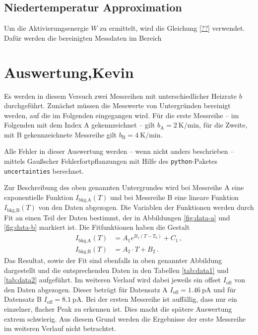 \subsection{Niedertemperatur Approximation}
Um die Aktivierungsenergie $W$ zu ermittelt, wird die Gleichung \eqref{??} verwendet.
Dafür werden die bereinigten Messdaten im Bereich  



























\section{Auswertung,Kevin}
Es werden in diesem Versuch zwei Messreihen mit unterschiedlicher Heizrate
$b$ durchgeführt. Zunächst müssen die Messwerte von Untergründen bereinigt
werden, auf die im Folgenden eingegangen wird.
Für die erste Messreihe -- im Folgenden mit dem Index A gekennzeichnet --
gilt $b_\text{A} = \SI{2}{\kelvin\per\minute}$, für die Zweite, mit B
gekennzeichnete Messreihe gilt $b_\text{B} = \SI{4}{\kelvin\per\minute}$.

Alle Fehler in dieser Auswertung werden -- wenn nicht anders beschrieben --
mittels Gaußscher Fehlerfortpflanzungen mit Hilfe des \texttt{python}-Paketes
\texttt{uncertainties} \cite{py-uncertainties} berechnet.

Zur Beschreibung des oben genannten Untergrundes wird bei Messreihe A eine
exponentielle Funktion $I_\text{bkg,A}(T)$ und bei Messreihe B eine lineare
Funktion
$I_\text{bkg,B}(T)$ von den Daten abgezogen. Die Variablen der Funktionen werden
durch Fit an einen Teil der Daten bestimmt, der in Abbildungen
\ref{fig:data-a} und \ref{fig:data-b} markiert ist.
Die Fitfunktionen haben die Gestalt
\begin{align*}
    I_\text{bkg,A}(T) &= A_1 e^{B_1 (T-T_0)} + C_1\,,\\
    I_\text{bkg,B}(T) &= A_2\cdot T + B_2\,.
\end{align*}
Das Resultat, sowie der Fit sind ebenfalls in oben genannter Abbildung
dargestellt und die entsprechenden Daten in den Tabellen \ref{tab:data1} und
\ref{tab:data2} aufgeführt.
Im weiteren Verlauf wird dabei jeweils ein offset $I_\text{off}$ von den Daten
abgezogen. Dieser beträgt für Datensatz A $I_\text{off} = \SI{1.46}{\pico\ampere}$
und für Datensatz B $I_\text{off} = \SI{8.1}{\pico\ampere}$.
Bei der ersten Messreihe ist auffällig, dass nur ein einzelner, flacher Peak
zu erkennen ist. Dies macht die spätere Auswertung extrem schwierig.
Aus diesem Grund werden die Ergebnisse der erste Messreihe im weiteren
Verlauf nicht betrachtet.

